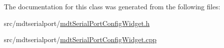 The documentation for this class was generated from the following files\-:\begin{DoxyCompactItemize}
\item 
src/mdtserialport/\hyperlink{mdt_serial_port_config_widget_8h}{mdt\-Serial\-Port\-Config\-Widget.\-h}\item 
src/mdtserialport/\hyperlink{mdt_serial_port_config_widget_8cpp}{mdt\-Serial\-Port\-Config\-Widget.\-cpp}\end{DoxyCompactItemize}
